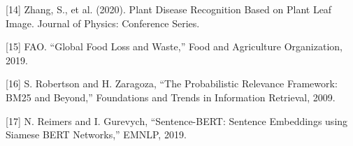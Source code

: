 {[}14{]} Zhang, S., et al. (2020). Plant Disease Recognition Based on
Plant Leaf Image. Journal of Physics: Conference Series.

{[}15{]} FAO. ``Global Food Loss and Waste,'' Food and Agriculture
Organization, 2019.

{[}16{]} S. Robertson and H. Zaragoza, ``The Probabilistic Relevance
Framework: BM25 and Beyond,'' Foundations and Trends in Information
Retrieval, 2009.

{[}17{]} N. Reimers and I. Gurevych, ``Sentence-BERT: Sentence
Embeddings using Siamese BERT Networks,'' EMNLP, 2019.
